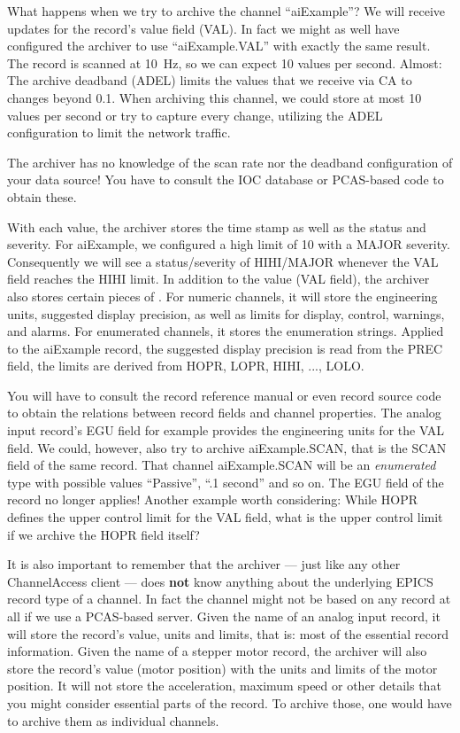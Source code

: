  

\noindent What happens when we try to archive the channel ``aiExample''?
We will receive updates for the record's value field (VAL). In fact we
might as well have configured the archiver to use ``aiExample.VAL''
with exactly the same result.
The record is scanned at 10~Hz, so we can expect 10 values per second.
Almost: The archive deadband (ADEL) limits the values that we receive
via CA to changes beyond 0.1. When archiving this channel, we could
store at most 10 values per second or try to capture every change,
utilizing the ADEL configuration to limit the network traffic.

\NOTE The archiver has no knowledge of the scan rate nor the deadband
configuration of your data source! You have to consult the IOC
database or PCAS-based code to obtain these.

With each value, the archiver stores the time stamp as well as the
status and severity. For aiExample, we configured a high limit of 10
with a MAJOR severity. Consequently we will see a status/severity of
HIHI/MAJOR whenever the VAL field reaches the HIHI limit.
In addition to the value (VAL field), the archiver also stores certain
pieces of . For numeric channels, it will store the
engineering units, suggested display precision, as well as limits for
display, control, warnings, and alarms. For enumerated channels, it
stores the enumeration strings.
Applied to the aiExample record, the suggested display precision is
read from the PREC field, the limits are derived from HOPR, LOPR,
HIHI, ..., LOLO.

\NOTE You will have to consult the record reference manual or even
record source code to obtain the relations between record fields and
channel properties. The analog input record's EGU field for example
provides the engineering units for the VAL field. We could, however,
also try to archive aiExample.SCAN, that is the SCAN field of the same
record. That channel aiExample.SCAN will be an \emph{enumerated} type
with possible values ``Passive'', ``.1 second'' and so on. The EGU
field of the record no longer applies!
Another example worth considering: While HOPR defines the upper
control limit for the VAL field, what is the upper control limit if we
archive the HOPR field itself?

It is also important to remember that the archiver
--- just like any other ChannelAccess client --- does {\bfseries not} know
anything about the underlying EPICS record type of a channel. In fact
the channel might not be based on any record at all if we use a
PCAS-based server.
Given the name of an analog input record, it will store the record's
value, units and limits, that is: most of the essential record
information. Given the name of a stepper motor record, the
archiver will also store the record's value (motor position) with the
units and limits of the motor position. It will not store the
acceleration, maximum speed or other details that you might consider
essential parts of the record. To archive those, one would have to
archive them as individual channels.

